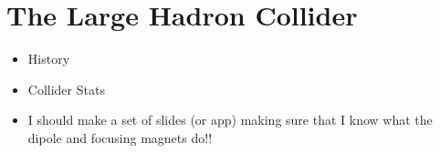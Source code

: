 \chapter{The Large Hadron Collider}
\label{ch:lhc}

\begin{itemize}
	\item History
	\item Collider Stats
	\item I should make a set of slides (or app) making sure that I know what the dipole and focusing magnets do!!
\end{itemize}